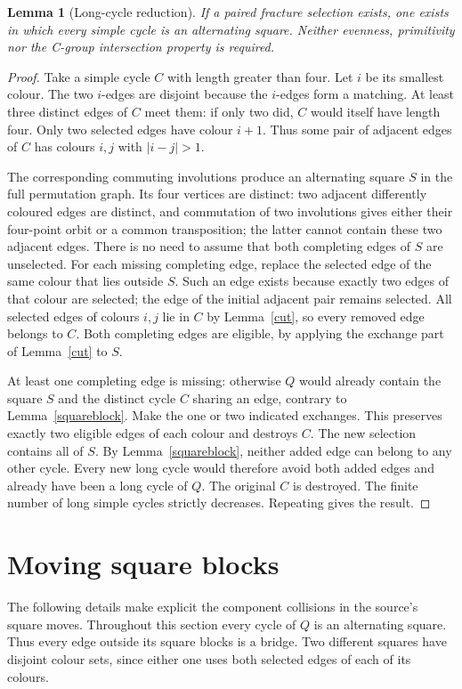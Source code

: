 \documentclass[11pt,a4paper]{article}
\newtheorem{lemma}[theorem]{Lemma}
\begin{document}
\begin{lemma}[Long-cycle reduction]\label{long}
If a paired fracture selection exists, one exists in which every simple
cycle is an alternating square. Neither evenness, primitivity nor the
C-group intersection property is required.
\end{lemma}
\begin{proof}
Take a simple cycle $C$ with length greater than four. Let $i$ be its
smallest colour. The two $i$-edges are disjoint because the $i$-edges
form a matching. At least three distinct edges of $C$ meet them: if
only two did, $C$ would itself have length four. Only two selected
edges have colour $i+1$. Thus some pair of adjacent edges of $C$ has
colours $i,j$ with $|i-j|>1$.

The corresponding commuting involutions produce an alternating square
$S$ in the full permutation graph. Its four vertices are distinct: two
adjacent differently coloured edges are distinct, and commutation of
two involutions gives either their four-point orbit or a common
transposition; the latter cannot contain these two adjacent edges.
There is no need to assume that both completing edges of $S$ are
unselected. For each missing completing edge, replace the selected
edge of the same colour that lies outside $S$. Such an edge exists
because exactly two edges of that colour are selected; the edge of
the initial adjacent pair remains selected. All selected edges of
colours $i,j$ lie in $C$ by Lemma~\ref{cut}, so every removed edge
belongs to $C$. Both completing edges are eligible, by applying the
exchange part of Lemma~\ref{cut} to $S$.

At least one completing edge is missing: otherwise $Q$ would already
contain the square $S$ and the distinct cycle $C$ sharing an edge,
contrary to Lemma~\ref{squareblock}. Make the one or two indicated
exchanges. This preserves exactly two eligible edges of each colour
and destroys $C$.
The new selection contains all of $S$. By Lemma~\ref{squareblock},
neither added edge can belong to any other cycle. Every new long cycle
would therefore avoid both added edges and already have been a long
cycle of $Q$. The original $C$ is destroyed. The finite number of
long simple cycles strictly decreases. Repeating gives the result.
\end{proof}

\section*{Moving square blocks}
The following details make explicit the component collisions in the
source's square moves. Throughout this section every cycle of $Q$ is
an alternating square. Thus every edge outside its square blocks is a
bridge. Two different squares have disjoint colour sets, since either
one uses both selected edges of each of its colours.
\end{document}

